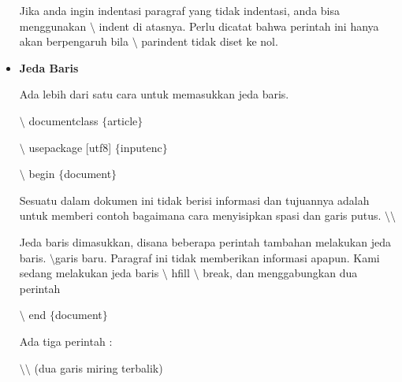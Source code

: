 \begin{itemize}
Jika anda ingin indentasi paragraf yang tidak indentasi, anda bisa menggunakan $\setminus$ indent di atasnya. Perlu dicatat bahwa perintah ini hanya akan berpengaruh bila $\setminus$ parindent tidak diset ke nol.\par

\vspace{10pt}
	\item {\fontsize{14pt}{14pt}\selectfont \textbf{Jeda Baris}}\par

Ada lebih dari satu cara untuk memasukkan jeda baris.\par

\hspace*{0.5in}$\setminus$ documentclass $ \{ $article$ \} $\par

\hspace*{0.5in}$\setminus$ usepackage [utf8] $ \{ $inputenc$ \} $\par

\hspace*{0.5in}$\setminus$ begin $ \{ $document$ \} $\par

\hspace*{0.5in}Sesuatu dalam dokumen ini tidak berisi informasi dan tujuannya adalah untuk memberi \hspace*{0.5in}contoh bagaimana cara menyisipkan spasi dan garis putus. $\setminus$$\setminus$\par

\hspace*{0.5in}Jeda baris dimasukkan, disana beberapa perintah tambahan melakukan jeda baris. $\setminus$garis \hspace*{0.5in}baru. Paragraf ini tidak memberikan informasi apapun. Kami sedang melakukan jeda baris \hspace*{0.5in}$\setminus$ hfill \hspace*{0.5in}$\setminus$ break, dan menggabungkan dua perintah\par

\hspace*{0.5in}$\setminus$ end $ \{ $document$ \} $\par

Ada tiga perintah :\par

\hspace*{0.5in}$\setminus$$\setminus$ (dua garis miring terbalik)\par


\end{itemize}
